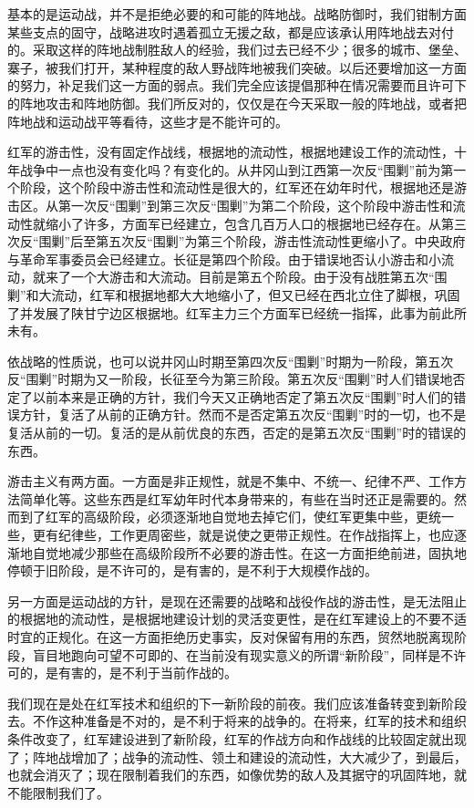 基本的是运动战，并不是拒绝必要的和可能的阵地战。战略防御时，我们钳制方面某些支点的固守，战略进攻时遇着孤立无援之敌，都是应该承认用阵地战去对付的。采取这样的阵地战制胜敌人的经验，我们过去已经不少；很多的城市、堡垒、寨子，被我们打开，某种程度的敌人野战阵地被我们突破。以后还要增加这一方面的努力，补足我们这一方面的弱点。我们完全应该提倡那种在情况需要而且许可下的阵地攻击和阵地防御。我们所反对的，仅仅是在今天采取一般的阵地战，或者把阵地战和运动战平等看待，这些才是不能许可的。

红军的游击性，没有固定作战线，根据地的流动性，根据地建设工作的流动性，十年战争中一点也没有变化吗？有变化的。从井冈山到江西第一次反“围剿”前为第一个阶段，这个阶段中游击性和流动性是很大的，红军还在幼年时代，根据地还是游击区。从第一次反“围剿”到第三次反“围剿”为第二个阶段，这个阶段中游击性和流动性就缩小了许多，方面军已经建立，包含几百万人口的根据地已经存在。从第三次反“围剿”后至第五次反“围剿”为第三个阶段，游击性流动性更缩小了。中央政府与革命军事委员会已经建立。长征是第四个阶段。由于错误地否认小游击和小流动，就来了一个大游击和大流动。目前是第五个阶段。由于没有战胜第五次“围剿”和大流动，红军和根据地都大大地缩小了，但又已经在西北立住了脚根，巩固了并发展了陕甘宁边区根据地。红军主力三个方面军已经统一指挥，此事为前此所未有。

依战略的性质说，也可以说井冈山时期至第四次反“围剿”时期为一阶段，第五次反“围剿”时期为又一阶段，长征至今为第三阶段。第五次反“围剿”时人们错误地否定了以前本来是正确的方针，我们今天又正确地否定了第五次反“围剿”时人们的错误方针，复活了从前的正确方针。然而不是否定第五次反“围剿”时的一切，也不是复活从前的一切。复活的是从前优良的东西，否定的是第五次反“围剿”时的错误的东西。

游击主义有两方面。一方面是非正规性，就是不集中、不统一、纪律不严、工作方法简单化等。这些东西是红军幼年时代本身带来的，有些在当时还正是需要的。然而到了红军的高级阶段，必须逐渐地自觉地去掉它们，使红军更集中些，更统一些，更有纪律些，工作更周密些，就是说使之更带正规性。在作战指挥上，也应逐渐地自觉地减少那些在高级阶段所不必要的游击性。在这一方面拒绝前进，固执地停顿于旧阶段，是不许可的，是有害的，是不利于大规模作战的。

另一方面是运动战的方针，是现在还需要的战略和战役作战的游击性，是无法阻止的根据地的流动性，是根据地建设计划的灵活变更性，是在红军建设上的不要不适时宜的正规化。在这一方面拒绝历史事实，反对保留有用的东西，贸然地脱离现阶段，盲目地跑向可望不可即的、在当前没有现实意义的所谓“新阶段”，同样是不许可的，是有害的，是不利于当前作战的。

我们现在是处在红军技术和组织的下一新阶段的前夜。我们应该准备转变到新阶段去。不作这种准备是不对的，是不利于将来的战争的。在将来，红军的技术和组织条件改变了，红军建设进到了新阶段，红军的作战方向和作战线的比较固定就出现了；阵地战增加了；战争的流动性、领土和建设的流动性，大大减少了，到最后，也就会消灭了；现在限制着我们的东西，如像优势的敌人及其据守的巩固阵地，就不能限制我们了。

